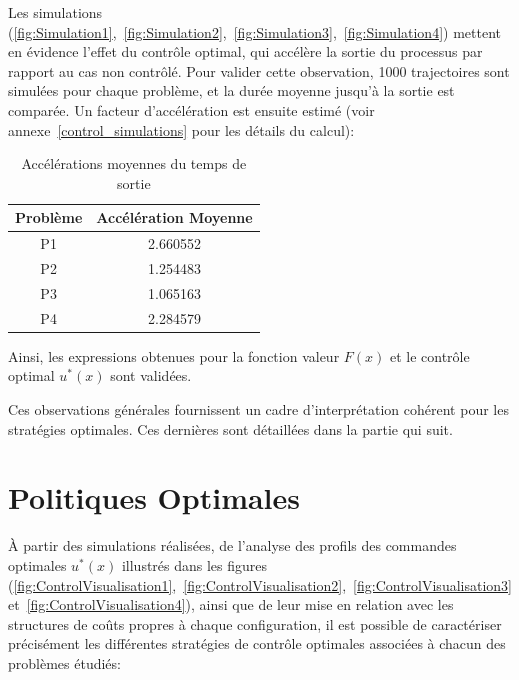 Les simulations (\ref{fig:Simulation1},~\ref{fig:Simulation2},~\ref{fig:Simulation3},~\ref{fig:Simulation4}) mettent en évidence l'effet du contrôle optimal, qui accélère la sortie du processus par rapport au cas non contrôlé. Pour valider cette observation, 1000 trajectoires sont simulées pour chaque problème, et la durée moyenne jusqu'à la sortie est comparée. Un facteur d'accélération est ensuite estimé (voir annexe~\ref{control_simulations} pour les détails du calcul):
    \begin{table}[htb]
        \centering
        \caption{Accélérations moyennes du temps de sortie}\label{tab:acceleration_results}
        \renewcommand{\arraystretch}{1.1}
        \begin{tabular}{||c|c||}
        \hline
        Problème & Accélération Moyenne \\\hline\hline
        P1 & 2.660552 \\
        P2 & 1.254483 \\
        P3 & 1.065163 \\
        P4 & 2.284579 \\
        \hline
        \end{tabular}
    \end{table}
\FloatBarrier Ainsi, les expressions obtenues pour la fonction valeur $F(x)$ et le contrôle optimal $u^*(x)$ sont validées.

Ces observations générales fournissent un cadre d'interprétation cohérent pour les stratégies optimales. Ces dernières sont détaillées dans la partie qui suit.
\section{Politiques Optimales}
À partir des simulations réalisées, de l'analyse des profils des commandes optimales \( u^*(x) \) illustrés dans les figures (\ref{fig:ControlVisualisation1},~\ref{fig:ControlVisualisation2},~\ref{fig:ControlVisualisation3} et~\ref{fig:ControlVisualisation4}), ainsi que de leur mise en relation avec les structures de coûts propres à chaque configuration, il est possible de caractériser précisément les différentes stratégies de contrôle optimales associées à chacun des problèmes étudiés:
